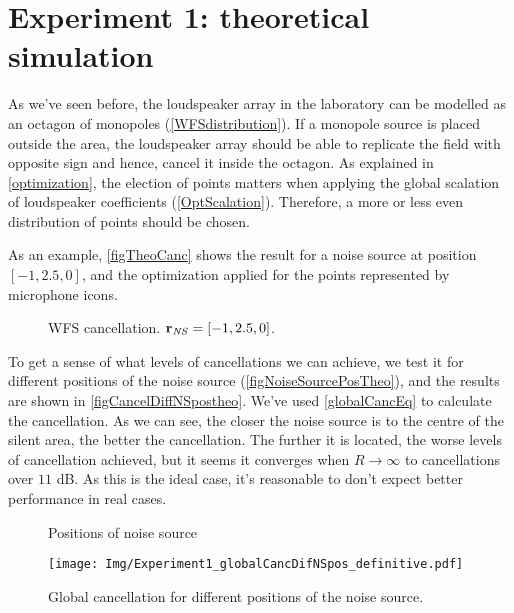 \section{Experiment 1: theoretical simulation}
As we've seen before, the loudspeaker array in the laboratory can be modelled as an octagon of monopoles (\autoref{WFSdistribution}). If a monopole source is placed outside the area, the loudspeaker array should be able to replicate the field with opposite sign and hence, cancel it inside the octagon. As explained in \autoref{optimization}, the election of points matters when applying the global scalation of loudspeaker coefficients (\autoref{OptScalation}). Therefore, a more or less even distribution of points should be chosen.

As an example, \autoref{figTheoCanc} shows the result for a noise source at position $[-1, 2.5, 0]$, and the optimization applied for the points represented by microphone icons.

\begin{figure}
	\centering
	\caption[WFS cancellation]{WFS cancellation. $\mathbf{r}_{\mathit{NS}} = [-1, 2.5, 0]$.}
	\label{figTheoCanc}
\end{figure}

To get a sense of what levels of cancellations we can achieve, we test it for different positions of the noise source (\autoref{figNoiseSourcePosTheo}), and the results are shown in \autoref{figCancelDiffNSpostheo}. We've used \autoref{globalCancEq} to calculate the cancellation. As we can see, the closer the noise source is to the centre of the silent area, the better the cancellation. The further it is located, the worse levels of cancellation achieved, but it seems it converges when $R\rightarrow\infty$ to cancellations over $11$ dB. As this is the ideal case, it's reasonable to don't expect better performance in real cases.

\begin{figure}[h]
	\centering
	\begin{minipage}[b]{0.49\textwidth}
			\centering
			\def\svgwidth{\columnwidth}
			\graphicspath{{Img/}}
			
			\caption[Positions of noise source]{Positions of noise source}
			\label{figNoiseSourcePosTheo}
	\end{minipage}
	\begin{minipage}[b]{0.49\textwidth}
			\centering
		\texttt{[image: Img/Experiment1\_globalCancDifNSpos\_definitive.pdf]}
		\caption[Global cancellation. Theoretical model.]{Global cancellation for different positions of the noise source.}
		\label{figCancelDiffNSpostheo}
	\end{minipage}
\end{figure}

